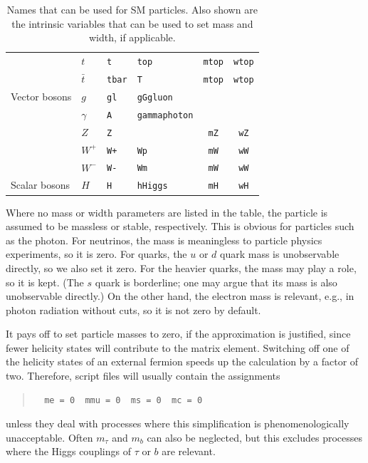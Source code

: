 \documentclass[12pt]{book}
\newcommand{\ttt}[1]{\texttt{#1}}
\begin{document}
\begin{table}[p]
\begin{center}
\begin{tabular}{|l|l|l|l|cc|}
      \hline
      &$t$ & \verb|t| & \ttt{top} &  \ttt{mtop} & \ttt{wtop} \\
      &$\bar t$ & \verb|tbar| & \ttt{T} &  \ttt{mtop} & \ttt{wtop} \\
      \hline\hline
      Vector bosons
      &$g$ & \verb|gl| & \ttt{g}\quad\ttt{G}\quad\ttt{gluon} & & \\
      \hline
      &$\gamma$ & \verb|A| & \ttt{gamma}\quad\ttt{photon} & & \\
      \hline
      &$Z$ & \verb|Z| & & \ttt{mZ} & \ttt{wZ} \\
      \hline
      &$W^+$ & \verb|W+| & \ttt{Wp} & \ttt{mW} & \ttt{wW} \\
      &$W^-$ & \verb|W-| & \ttt{Wm} & \ttt{mW} & \ttt{wW} \\
      \hline\hline
      Scalar bosons
      &$H$ & \verb|H| & \ttt{h}\quad \ttt{Higgs} & \ttt{mH} & \ttt{wH} \\
      \hline
    \end{tabular}
  \end{center}
  \caption{\label{tab:SM-particles} Names that can be used for SM particles.
    Also shown are the intrinsic variables that can be used to set mass and
    width, if applicable.}
\end{table}

Where no mass or width parameters are listed in the table, the particle is
assumed to be massless or stable, respectively.  This is obvious for particles
such as the photon.  For neutrinos, the mass is meaningless to particle
physics experiments, so it is zero.  For quarks, the $u$ or $d$ quark mass is
unobservable directly, so we also set it zero.  For the heavier quarks, the
mass may play a role, so it is kept.  (The $s$ quark is borderline; one may
argue that its mass is also unobservable directly.)  On the other hand, the
electron mass is relevant, e.g., in photon radiation without cuts, so it is
not zero by default.

It pays off to set particle masses to zero, if the approximation is justified,
since fewer helicity states will contribute to the matrix element.  Switching
off one of the helicity states of an external fermion speeds up the
calculation by a factor of two.  Therefore, script files will usually contain
the assignments
\begin{quote}
\begin{footnotesize}
\begin{verbatim}
  me = 0  mmu = 0  ms = 0  mc = 0
\end{verbatim}
\end{footnotesize}
\end{quote}
unless they deal with processes where this simplification is
phenomenologically unacceptable.  Often $m_\tau$ and $m_b$ can also be
neglected, but this excludes processes where the Higgs couplings of $\tau$ or
$b$ are relevant.  
\end{document}

